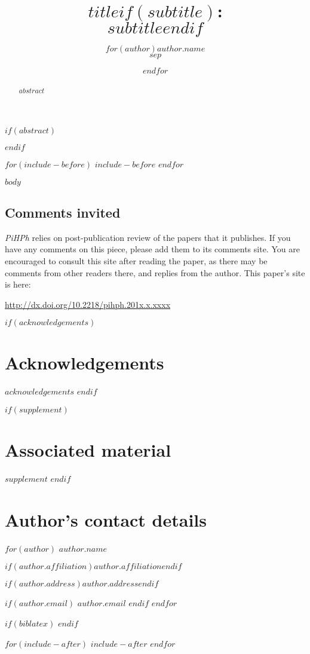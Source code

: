 \documentclass[article, a4paper, 12pt, $for(classoption)$$classoption$$sep$,$endfor$]{memoir}
\date{}
\title{$title$$if(subtitle)$:\\$subtitle$$endif$}
\author{$for(author)$$author.name$\\\affiliation{$author.affiliation$}$sep$ \and $endfor$}
\newcommand\thisdoi{10.2218/pihph.201x.x.xxxx}
\newcommand\thisdoilink{http://dx.doi.org/\thisdoi}
\newcommand\commentsinvited{
\begin{tcdoublebox}

\section*{\textcolor{pihphgreen}{Comments invited}}

\textit{PiHPh} relies on post-publication review of the papers that it publishes. If you have any comments on this piece, please add them to its comments site. You are encouraged to consult this site after reading the paper, as there may be comments from other readers there, and replies from the author. This paper's site is here:

\vspace*{1ex}\noindent \url{\thisdoilink}

\end{tcdoublebox}
}
\begin{document}
\setcounter{page}{1}
\maketitle
\thispagestyle{empty}

$if(abstract)$
\begin{abstract}
\noindent $abstract$
\end{abstract}
$endif$

$for(include-before)$
$include-before$
$endfor$

$body$

\commentsinvited %

$if(acknowledgements)$
\section*{Acknowledgements}
$acknowledgements$
$endif$

$if(supplement)$
\section*{Associated material}
$supplement$
$endif$

\section*{Author's contact details}
\label{sec:auth-cont-deta}

$for(author)$
\noindent \textit{$author.name$}

$if(author.affiliation)$\noindent $author.affiliation$$endif$

$if(author.address)$\noindent $author.address$$endif$

$if(author.email)$
\vspace*{5pt}
\noindent \textit{$author.email$}
$endif$
$endfor$

$if(biblatex)$
\printbibliography[title=References]
$endif$

%


$for(include-after)$
$include-after$
$endfor$
\end{document}
